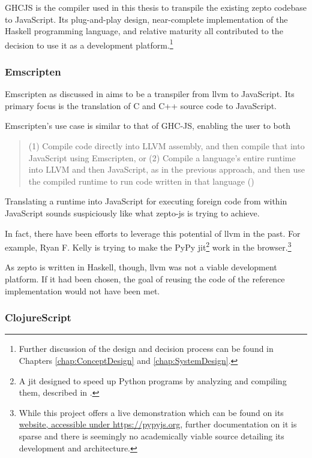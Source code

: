 \documentclass[oneside,11pt,xetex]{scrbook}
\begin{document}
GHCJS is the compiler used in this thesis to transpile the existing zepto codebase
to JavaScript. Its plug-and-play design, near-complete implementation of the
Haskell programming language, and relative maturity all contributed to the decision
to use it as a development platform.\footnote{Further discussion of the design
and decision process can be found in Chapters \ref{chap:ConceptDesign} and
\ref{chap:SystemDesign}.}

\subsubsection{Emscripten}

Emscripten as discussed in \parencite{ZAKA} aims to be a transpiler from \gls{llvm} to
JavaScript. Its primary focus is the translation of C and C++ source code
to JavaScript.

Emscripten's use case is similar to that of GHC-JS, enabling the user to both \blockquote{(1)
Compile code directly into LLVM assembly, and then compile that into JavaScript
using Emscripten, or (2) Compile a language’s entire runtime into LLVM and then
JavaScript, as in the previous approach, and then use the compiled runtime to
run code written in that language (\cite{ZAKA})}. Translating a runtime into
JavaScript for executing foreign code from within JavaScript sounds
suspiciously like what zepto-js is trying to achieve.

In fact, there have been efforts to leverage this potential of \gls{llvm} in
the past. For example, Ryan F. Kelly is trying to make the PyPy \gls{jit}\footnote{A \gls{jit}
designed to speed up Python programs by analyzing and compiling them, described
in \parencite{PYPY}.} work in the browser.\footnote{While this project offers
a live demonstration which can be found on its \href{https://pypyjs.org}{website, accessible
under https://pypyjs.org}, further documentation on it is sparse and there is seemingly
no academically viable source detailing its development and architecture.}

As zepto is written in Haskell, though, \gls{llvm} was not a viable development
platform. If it had been chosen, the goal of reusing the code of the reference
implementation would not have been met.

\subsubsection{ClojureScript}
\label{sec:ClojureScript}
\end{document}
